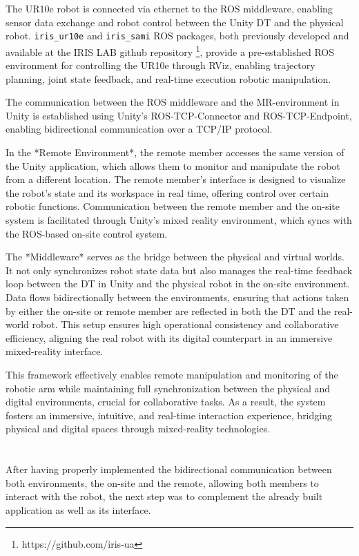 The UR10e robot is connected via ethernet to the \ac{ROS} middleware, enabling sensor data exchange and robot control between the Unity \ac{DT} and the physical robot. \texttt{iris\_ur10e} and \texttt{iris\_sami} \ac{ROS} packages, both previously developed and available at the IRIS LAB github repository \footnote{https://github.com/iris-ua}, provide a pre-established \ac{ROS} environment for controlling the UR10e through RViz, enabling trajectory planning, joint state feedback, and real-time execution robotic manipulation.

The communication between the \ac{ROS} middleware and the \ac{MR}-environment in Unity is established using Unity’s \ac{ROS}-TCP-Connector and \ac{ROS}-TCP-Endpoint, enabling bidirectional communication over a TCP/IP protocol.

In the *Remote Environment*, the remote member accesses the same version of the Unity application, which allows them to monitor and manipulate the robot from a different location. The remote member's interface is designed to visualize the robot’s state and its workspace in real time, offering control over certain robotic functions. Communication between the remote member and the on-site system is facilitated through Unity's mixed reality environment, which syncs with the \ac{ROS}-based on-site control system.

The *Middleware* serves as the bridge between the physical and virtual worlds. It not only synchronizes robot state data but also manages the real-time feedback loop between the \ac{DT} in Unity and the physical robot in the on-site environment. Data flows bidirectionally between the environments, ensuring that actions taken by either the on-site or remote member are reflected in both the \ac{DT} and the real-world robot. This setup ensures high operational consistency and collaborative efficiency, aligning the real robot with its digital counterpart in an immersive mixed-reality interface.

This framework effectively enables remote manipulation and monitoring of the robotic arm while maintaining full synchronization between the physical and digital environments, crucial for collaborative tasks. As a result, the system fosters an immersive, intuitive, and real-time interaction experience, bridging physical and digital spaces through mixed-reality technologies.





\section{}
After having properly implemented the bidirectional communication between both environments, the on-site and the remote, allowing both members to interact with the robot, the next step was to complement the already built application as well as its interface. 

